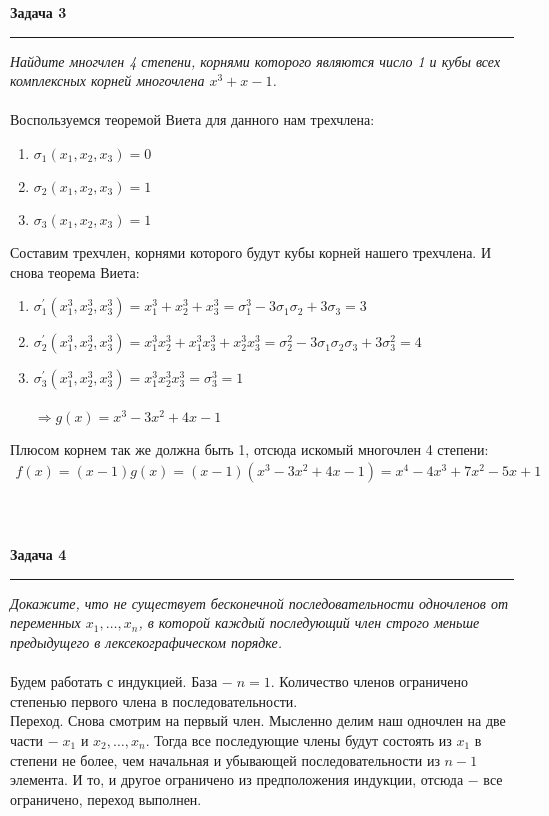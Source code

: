\documentclass[a4paper,11pt]{article}
\begin{document}
\textbf{\large Задача 3}
\medskip\hrule\medskip
\textit{Найдите многчлен 4 степени, корнями которого являются число 1 и кубы всех комплексных корней  многочлена $ x^3 + x - 1 $. } \\ \\ 
Воспользуемся теоремой Виета для данного нам трехчлена:
\begin{enumerate}
	\item $ \sigma_1(x_1, x_2, x_3) = 0 $
	\item $ \sigma_2(x_1, x_2, x_3) = 1 $
	\item $ \sigma_3(x_1, x_2, x_3) = 1 $
\end{enumerate}
Составим трехчлен, корнями которого будут кубы корней нашего трехчлена. И снова теорема Виета:
\begin{enumerate}
	\item $ \sigma_1^{'}(x_1^3, x_2^3, x_3^3) = x_1^3 + x_2^3 + x_3^3 = \sigma_1^3 - 3\sigma_1\sigma_2 + 3\sigma_3 = 3 $
	\item $ \sigma_2^{'}(x_1^3, x_2^3, x_3^3) = x_1^3x_2^3 + x_1^3x_3^3 + x_2^3x_3^3 = \sigma_2^2 - 3\sigma_1\sigma_2\sigma_3 + 3\sigma_3^2 = 4 $
	\item $ \sigma_3^{'}(x_1^3, x_2^3, x_3^3) = x_1^3x_2^3x_3^3 = \sigma_3^3 = 1 $ \\ \\[2pt]
	$ \Rightarrow g(x) = x^3 - 3x^2 + 4x - 1 $
\end{enumerate}
Плюсом корнем так же должна быть 1, отсюда искомый многочлен 4 степени:
\begin{gather*}
	f(x) = (x - 1)g(x) = (x - 1)(x^3 - 3x^2 + 4x - 1) = x^4 - 4x^3 + 7x^2 - 5x + 1
\end{gather*} \\ \\ \\










\textbf{\large Задача 4}
\medskip\hrule\medskip
\textit{Докажите, что не существует бесконечной последовательности одночленов от переменных $ x_1, \dots, x_n $, в которой каждый последующий член строго меньше предыдущего в лексекографическом порядке.} \\ \\ 
Будем работать с индукцией. База $ - \; n = 1 $.  Количество членов ограничено степенью первого члена в последовательности. \\
Переход. Снова смотрим на первый член. Мысленно делим наш одночлен на две части $ - \; x_1 $ и $ x_2, \dots, x_n $. Тогда все последующие члены будут состоять из $ x_1 $ в степени не более, чем начальная и убывающей последовательности из $ n - 1 $ элемента. И то, и другое ограничено из предположения индукции, отсюда $ - $ все ограничено, переход выполнен.
\end{document}
